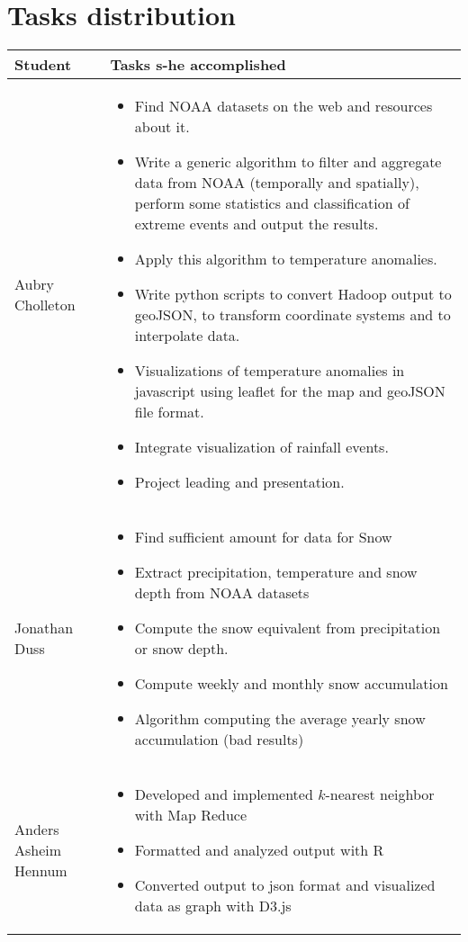 \section{Tasks distribution}
\begin{longtable}{|l|p{10.5cm}|}
\hline
\textbf{Student} & \textbf{Tasks s-he accomplished} \\
\hline
Aubry Cholleton & \begin{itemize}
	\item Find NOAA datasets on the web and resources about it.
	\item Write a generic algorithm to filter and aggregate data from NOAA (temporally and spatially), perform some statistics and classification of extreme events and output the results.
	\item Apply this algorithm to temperature anomalies.
	\item Write python scripts to convert Hadoop output to geoJSON, to transform coordinate systems and to interpolate data.
	\item Visualizations of temperature anomalies in javascript using leaflet for the map and geoJSON file format.
	\item Integrate visualization of rainfall events.
	\item Project leading and presentation.
\end{itemize}\\
\hline
Jonathan Duss & \begin{itemize}
	\item Find sufficient amount for data for Snow
	\item Extract precipitation, temperature and snow depth from NOAA datasets
	\item Compute the snow equivalent from precipitation or snow depth.
	\item Compute weekly and monthly snow accumulation
	\item Algorithm computing the average yearly snow accumulation  (bad results)
\end{itemize}\\ 
\hline
Anders Asheim Hennum & \begin{itemize}
	\item Developed and implemented $k$-nearest neighbor with Map Reduce
	\item Formatted and analyzed output with R
	\item Converted output to json format and visualized data as graph with D3.js
\end{itemize}\\

\end{longtable}
